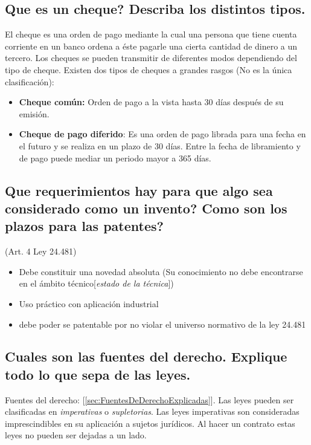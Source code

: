 \documentclass{article}
\begin{document}
\subsection{Que es un cheque? Describa los distintos tipos.} \label{ssec:chequesprimeratipificacion}
El cheque es una orden de pago mediante la cual una persona que tiene cuenta corriente en un banco ordena a éste pagarle una cierta cantidad de dinero a un tercero. Los cheques se pueden transmitir de diferentes modos dependiendo del tipo de cheque.
Existen dos tipos de cheques a grandes rasgos (No es la única clasificación):
\begin{itemize}
\item \textbf{Cheque común:} Orden de pago a la vista hasta 30 días después de su emisión.
\item \textbf{Cheque de pago diferido}: Es una orden de pago librada para una fecha en el futuro y se realiza en un plazo de 30 días. Entre la fecha de libramiento y de pago puede mediar un periodo mayor a 365 días.
\end{itemize}



\subsection{Que requerimientos hay para que algo sea considerado como un invento? Como son los plazos para las patentes?}
\label{sec:ReqParaConsiderarUnInventoyPlazosPatentes}

(Art. 4 Ley 24.481) 
\begin{itemize}
    \item Debe constituir una novedad absoluta (Su conocimiento no debe encontrarse en el ámbito técnico[\textit{estado de la técnica}])
    \item Uso práctico con aplicación industrial
    \item debe poder se patentable por no violar el universo normativo de la ley 24.481 
\end{itemize}

\subsection{Cuales son las fuentes del derecho. Explique todo lo que sepa de las leyes.}
Fuentes del derecho: [\ref{sec:FuentesDeDerechoExplicadas}]. Las leyes pueden ser clasificadas en \textit{imperativas} o \textit{supletorias}. 
\label{sec:LeyesTodo}
Las leyes imperativas son consideradas imprescindibles en su aplicación a sujetos jurídicos. Al hacer un contrato estas leyes no pueden ser dejadas a un lado.
\end{document}
